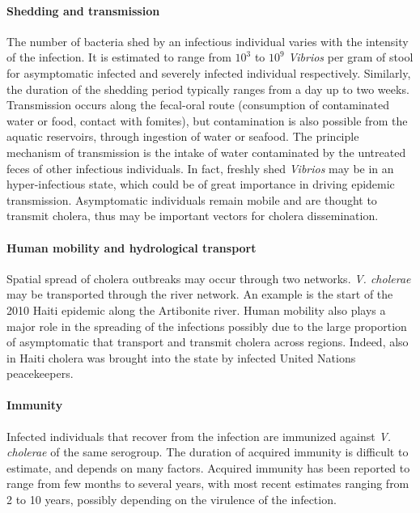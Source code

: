 \paragraph{Shedding and transmission} The number of bacteria shed by an infectious individual varies with the intensity of the infection. It is estimated to range from $10^3$ to $10^{9}$ \textit{Vibrios} per gram of stool for asymptomatic infected and severely infected individual respectively. Similarly, the duration of the shedding period typically ranges from a day up to two weeks.
Transmission occurs along the fecal-oral route (consumption of contaminated water or food, contact with fomites), but contamination is also possible from the aquatic reservoirs, through ingestion of water or seafood. The principle mechanism of transmission is the intake of water contaminated by the untreated feces of other infectious individuals. In fact, freshly shed \textit{Vibrios} may be in an hyper-infectious state, which could be of great importance in driving epidemic transmission\cite{Butler:CholeraStoolBacteria:2006}.
Asymptomatic individuals remain mobile and are thought to transmit cholera, thus may be important vectors for cholera dissemination.
\paragraph{Human mobility and hydrological transport} Spatial spread of cholera outbreaks may occur through two networks. \textit{V. cholerae} may be transported through the river network. An example is the start of the 2010 Haiti epidemic along the Artibonite river\cite{Piarroux:UnderstandingCholeraEpidemic:2011}. Human mobility also plays a major role in the spreading of the infections possibly due to the large proportion of asymptomatic that transport and transmit cholera across regions. Indeed, also in Haiti cholera was brought into the state by infected United Nations peacekeepers\cite{Piarroux:UnderstandingCholeraEpidemic:2011}. %

\paragraph{Immunity} Infected individuals that recover from the infection are immunized against \textit{V. cholerae}  of the same serogroup. The duration of acquired immunity is difficult to estimate, and depends on many factors. Acquired immunity has been reported to range from few months to several years, with most recent estimates ranging from 2 to 10 years, possibly depending on the virulence of the infection\cite{Levine:DurationInfectionDerivedImmunity:1981,Kaper:Cholera:1995,Woodward:CholeraReinfectionMan:1971,Glass:SeroepidemiologicalStudiesEI:1985,Clemens:BiotypeDeterminantNatural:1991,Leung:ProtectionAffordedPrevious:2021}.

